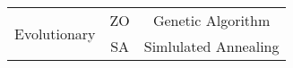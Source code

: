 \documentclass[twoside,a4paper,10pt]{article}
\begin{document}
\begin{tabular}{|p{3cm}|c|c|}
\hline
\multirow{2}{*}{Evolutionary} & ZO & Genetic Algorithm\\ 
                              & SA & Simlulated Annealing \\ 
\hline
\end{tabular}
\end{document}
